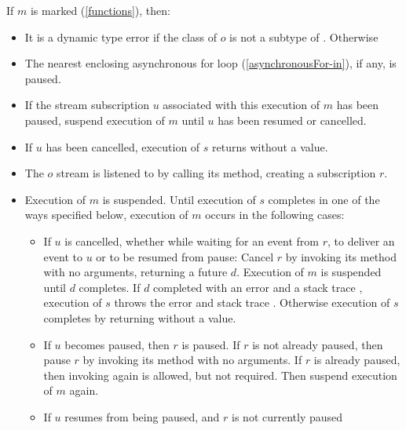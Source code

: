 \documentclass[makeidx]{article}
\begin{document}
{\LMHash{}%
If $m$ is marked \code{\ASYNC*} (\ref{functions}), then:
\begin{itemize}
\item
  It is a dynamic type error if the class of $o$
  is not a subtype of .
  Otherwise
\item
  The nearest enclosing asynchronous for loop (\ref{asynchronousFor-in}),
  if any, is paused.
\item
  If the stream subscription $u$ associated with this execution of $m$
  has been paused, suspend execution of $m$ until $u$ has been resumed or
  cancelled.
\item
  If $u$ has been cancelled, execution of $s$ returns without a value.
\item
  The $o$ stream is listened to by calling its  method,
  creating a subscription $r$.
\item
  Execution of $m$ is suspended. Until execution of $s$ completes in one of
  the ways specified below, execution of $m$ occurs in the following cases:
  \begin{itemize}
  \item If $u$ is cancelled, whether while waiting for an event from $r$,
    to deliver an event to $u$ or to be resumed from pause:
    Cancel $r$ by invoking its  method with no arguments,
    returning a future $d$.
    Execution of $m$ is suspended until $d$ completes.
    If $d$ completed with an error  and a stack trace ,
    execution of $s$ throws the error  and stack trace .
    Otherwise execution of $s$ completes by returning without a value.
  \item If $u$ becomes paused, then $r$ is paused.
    If $r$ is not already paused, then pause $r$ by invoking its 
    method with no arguments. If $r$ is already paused, then invoking
     again is allowed, but not required.
    Then suspend execution of $m$ again.
  \item If $u$ resumes from being paused, and $r$ is not currently paused

\end{itemize}
\end{itemize}}
\end{document}
